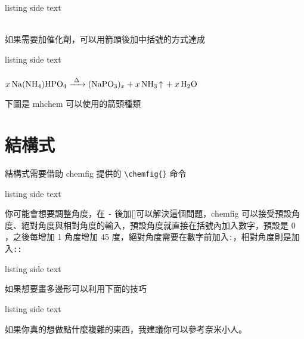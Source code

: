 \begin{tcblisting}{listing side text}
\\
\\
\end{tcblisting}

如果需要加催化劑，可以用箭頭後加中括號的方式達成

\begin{tcblisting}{listing side text}
\ce{A ->[text above][text below] B]}\\
\\
$\ce{x Na(NH4)HPO4 ->[\Delta] (NaPO3)_x + x NH3 ^ + x H2O}$
\end{tcblisting}

下圖是 mhchem 可以使用的箭頭種類

\section{結構式}

結構式需要借助 chemfig 提供的 \verb`\chemfig{}` 命令

\begin{tcblisting}{listing side text}
\end{tcblisting}

你可能會想要調整角度，在 \verb`-` 後加[]可以解決這個問題，chemfig 可以接受預設角度、絕對角度與相對角度的輸入，預設角度就直接在括號內加入數字，預設是 0 ，之後每增加 1 角度增加 45 度，絕對角度需要在數字前加入\verb`:`，相對角度則是加入\verb`::` 

\begin{tcblisting}{listing side text}
\end{tcblisting}

如果想要畫多邊形可以利用下面的技巧

\begin{tcblisting}{listing side text}
\\
\end{tcblisting}

如果你真的想做點什麼複雜的東西，我建議你可以參考奈米小人。
